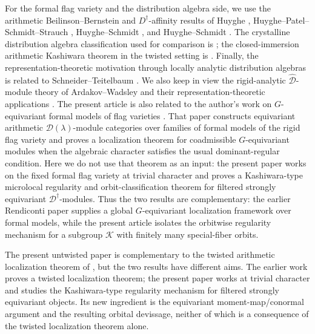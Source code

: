 \documentclass[11pt]{amsart}
\theoremstyle{plain}
\theoremstyle{definition}
\theoremstyle{remark}
\begin{document}
For the formal flag variety and the distribution algebra side, we use the
arithmetic Beilinson--Bernstein and \(D^\dagger\)-affinity results of Huyghe
\cite[Th\'eor\`eme 4.2.1]{HuygheProjectiveDdagger}, Huyghe--Patel--Schmidt--Strauch
\cite[Theorem 1.1]{HuyghePatelSchmidtStrauch}, Huyghe--Schmidt
\cite[\S4]{HuygheSchmidtDistributions}, and Huyghe--Schmidt
\cite[Theorem 3.2]{HuygheSchmidtFlag}.  The crystalline distribution algebra
classification used for comparison is \cite[Theorem 4.2.1]{HuygheSchmidtIntermediate};
the closed-immersion arithmetic Kashiwara theorem in the twisted setting is
\cite[Theorem 1.1]{HuygheTwistedKashiwara}.  Finally, the representation-theoretic
motivation through locally analytic distribution algebras is related to
Schneider--Teitelbaum \cite[Theorem 3.3]{SchneiderTeitelbaum}. We also keep in
view the rigid-analytic \(\widehat{\mathcal D}\)-module theory of
Ardakov--Wadsley \cite[Theorems A and B]{ArdakovWadsleyRigidD} and their
representation-theoretic applications \cite[Theorem A]{ArdakovWadsleyCompactReps}.
The present article is also related to the author's work on
\(G\)-equivariant formal models of flag varieties
\cite{SarrazolaRendiconti}.  That paper constructs equivariant arithmetic
\(\mathcal D(\lambda)\)-module categories over families of formal models of the
rigid flag variety and proves a localization theorem for coadmissible
\(G\)-equivariant modules when the algebraic character satisfies the usual
dominant-regular condition.  Here we do not use that theorem as an input: the
present paper works on the fixed formal flag variety at trivial character and
proves a Kashiwara-type microlocal regularity and orbit-classification theorem
for filtered strongly equivariant \(\mathscr D^\dagger\)-modules.  Thus the two
results are complementary: the earlier Rendiconti paper supplies a global
\(G\)-equivariant localization framework over formal models, while the present
article isolates the orbitwise regularity mechanism for a subgroup
\(\mathcal K\) with finitely many special-fiber orbits.

The present untwisted paper is complementary to the twisted arithmetic
localization theorem of \cite[Theorem 1.1]{SarrazolaJTNB}, but the two results
have different aims.  The earlier work proves a twisted localization theorem;
the present paper works at trivial character and studies the Kashiwara-type
regularity mechanism for filtered strongly equivariant objects.  Its new
ingredient is the equivariant moment-map/conormal argument and the resulting
orbital devissage, neither of which is a consequence of the twisted
localization theorem alone.
\end{document}
